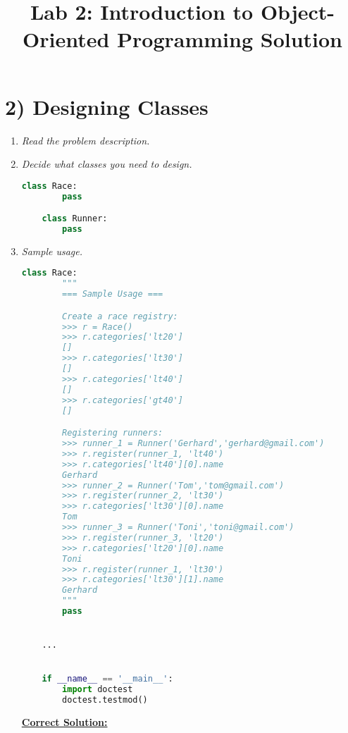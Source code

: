 \documentclass[12pt]{article}
\begin{document}
\title{Lab 2: Introduction to Object-Oriented Programming Solution}
\date{}
\maketitle

\section*{2) Designing Classes}
\begin{enumerate}[1.]
\item \textit{Read the problem description.}
\item \textit{Decide what classes you need to design.}

\begin{lstlisting}[language=Python]
    class Race:
        pass

    class Runner:
        pass
\end{lstlisting}

\item \textit{Sample usage.}

\begin{lstlisting}[language=Python]
    class Race:
        """
        === Sample Usage ===

        Create a race registry:
        >>> r = Race()
        >>> r.categories['lt20']
        []
        >>> r.categories['lt30']
        []
        >>> r.categories['lt40']
        []
        >>> r.categories['gt40']
        []

        Registering runners:
        >>> runner_1 = Runner('Gerhard','gerhard@gmail.com')
        >>> r.register(runner_1, 'lt40')
        >>> r.categories['lt40'][0].name
        Gerhard
        >>> runner_2 = Runner('Tom','tom@gmail.com')
        >>> r.register(runner_2, 'lt30')
        >>> r.categories['lt30'][0].name
        Tom
        >>> runner_3 = Runner('Toni','toni@gmail.com')
        >>> r.register(runner_3, 'lt20')
        >>> r.categories['lt20'][0].name
        Toni
        >>> r.register(runner_1, 'lt30')
        >>> r.categories['lt30'][1].name
        Gerhard
        """
        pass


    ...


    if __name__ == '__main__':
        import doctest
        doctest.testmod()

\end{lstlisting}

\begin{mdframed}
    \underline{\textbf{Correct Solution:}}


\end{mdframed}
\end{enumerate}
\end{document}
